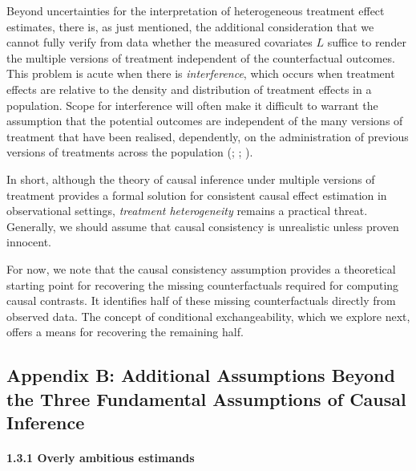 \documentclass[
  singlecolumn]{article}
\let\oldparagraph\paragraph
\renewcommand{\paragraph}[1]{\oldparagraph{#1}\mbox{}}
\begin{document}
Beyond uncertainties for the interpretation of heterogeneous treatment
effect estimates, there is, as just mentioned, the additional
consideration that we cannot fully verify from data whether the measured
covariates \(L\) suffice to render the multiple versions of treatment
independent of the counterfactual outcomes. This problem is acute when
there is \emph{interference}, which occurs when treatment effects are
relative to the density and distribution of treatment effects in a
population. Scope for interference will often make it difficult to
warrant the assumption that the potential outcomes are independent of
the many versions of treatment that have been realised, dependently, on
the administration of previous versions of treatments across the
population (;
;
).

In short, although the theory of causal inference under multiple
versions of treatment provides a formal solution for consistent causal
effect estimation in observational settings, \emph{treatment
heterogeneity} remains a practical threat. Generally, we should assume
that causal consistency is unrealistic unless proven innocent.

For now, we note that the causal consistency assumption provides a
theoretical starting point for recovering the missing counterfactuals
required for computing causal contrasts. It identifies half of these
missing counterfactuals directly from observed data. The concept of
conditional exchangeability, which we explore next, offers a means for
recovering the remaining half.

\newpage{}

\subsection{Appendix B: Additional Assumptions Beyond the Three
Fundamental Assumptions of Causal
Inference}\label{appendix-b-additional-assumptions-beyond-the-three-fundamental-assumptions-of-causal-inference}

\paragraph{1.3.1 Overly ambitious
estimands}\label{overly-ambitious-estimands}
\end{document}
